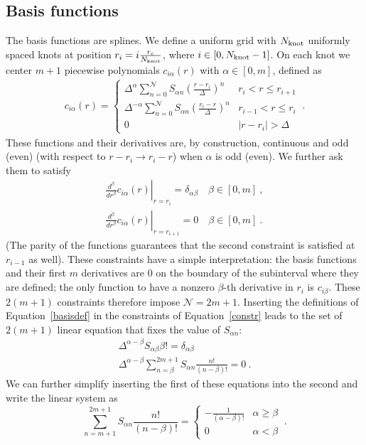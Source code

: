 \subsection{Basis functions}
The basis functions are splines. We define a uniform grid 
with $N_{\text{knot}}$ uniformly spaced knots at position $r_i=i\frac{r_c}{N_{\text{knot}}}$, 
where $i\in[0,N_{\text{knot}}-1]$. On each knot we center $m+1$ piecewise polynomials
$c_{i\alpha}(r)$ with $\alpha\in[0,m]$, defined as
\begin{eqnarray}
c_{i\alpha}(r)=\begin{cases}
\Delta^\alpha \sum_{n=0}^\mathcal{N} S_{\alpha n}(\frac{r-r_i}{\Delta})^n & r_i<r\le r_{i+1} \\
\Delta^{-\alpha} \sum_{n=0}^\mathcal{N} S_{\alpha n}(\frac{r_i-r}{\Delta})^n & r_{i-1}<r\le r_i \\
0 & |r-r_i| > \Delta
\end{cases}
\label{basisdef}\:.
\end{eqnarray}
These functions and their derivatives are, by construction, continuous and odd (even)
(with respect to $r-r_i\rightarrow r_i-r$) when $\alpha$ is odd (even).
We further ask them to satisfy
\begin{eqnarray}
\left.\frac{d^\beta}{dr^\beta} c_{i\alpha}(r)\right|_{r=r_i}=
\delta_{\alpha\beta} \quad \beta\in[0,m]\:,\\
\left.\frac{d^{\beta}}{dr^{\beta}} c_{i\alpha}(r)\right|_{r=r_{i+1}}=0\quad \beta\in[0,m]
\label{constr}\:.
\end{eqnarray}
(The parity of the functions guarantees that the second constraint is satisfied
at $r_{i-1}$ as well). These constraints have a simple interpretation: the basis functions
and their first $m$ derivatives are $0$ on the boundary of the subinterval where they
are defined; the only function to have a nonzero $\beta$-th derivative in $r_i$ is $c_{i\beta}$.
These $2(m+1)$ constraints therefore impose $\mathcal{N}=2m+1$. 
Inserting the definitions of Equation~\ref{basisdef} in the constraints of Equation~\ref{constr}
leads to the set of $2(m+1)$ linear equation that fixes the value of $S_{\alpha n}$: 
\begin{eqnarray}
\Delta^{\alpha-\beta} S_{\alpha\beta} \beta!=\delta_{\alpha\beta}
\label{Smatrix1}\\
\Delta^{\alpha-\beta}\sum_{n=\beta}^{2m+1} S_{\alpha n} \frac{n!}{(n-\beta)!}=0\:.
\end{eqnarray}
We can further simplify inserting the first of these equations into the second and write
the linear system as
\begin{equation}
\sum_{n=m+1}^{2m+1} S_{\alpha n} \frac{n!}{(n-\beta)!}=\begin{cases}
-\frac{1}{(\alpha-\beta)!}& \alpha\ge \beta \\
0 & \alpha < \beta
\end{cases}
\label{Smatrix2}\:.
\end{equation}

